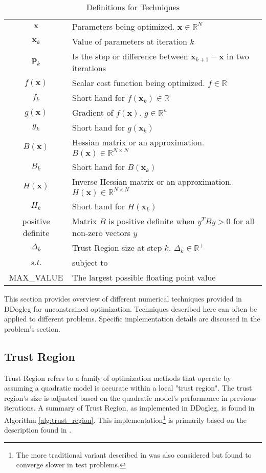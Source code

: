 \documentclass[peerreview,compsoc,onecolumn]{IEEEtran}
\newcommand{\R}{\mathbb{R}}
\begin{document}
\begin{table}[h]
\centering
\caption{\label{definitions:Techniques}Definitions for Techniques}
\begin{tabular}{cl}
$\bm{x}$ & Parameters being optimized. $\bm{x} \in \R^N$ \\
$\bm{x}_k$ & Value of parameters at iteration $k$ \\
$\bm{p}_k$ & Is the step or difference between $\bm{x}_{k+1}-\bm{x}$ in two iterations \\
$f(\bm{x})$ & Scalar cost function being optimized. $f \in \R$ \\
$f_k$ & Short hand for $f(\bm{x}_k) \in \R $ \\
$g(\bm{x})$ & Gradient of $f(\bm{x})$. $g \in \R^n$ \\
$g_k$ & Short hand for $g(\bm{x}_k)$ \\
$B(\bm{x})$ & Hessian matrix or an approximation. $B(\bm{x}) \in \R^{N \times N}$ \\ 
$B_k$ & Short hand for $B(\bm{x}_k)$ \\
$H(\bm{x})$ & Inverse Hessian matrix or an approximation. $H(\bm{x}) \in \R^{N \times N}$  \\ 
$H_k$ & Short hand for $H(\bm{x}_k)$ \\
positive definite & Matrix $B$ is positive definite when $y^T B y > 0$ for all non-zero vectors $y$  \\
$\Delta_k$ & Trust Region size at step $k$. $\Delta_k \in \R^{+}$\\
$s.t.$ & subject to  \\
MAX\_VALUE & The largest possible floating point value
\end{tabular}
\end{table}

This section provides overview of different numerical techniques provided in DDogleg for unconstrained optimization. Techniques described here can often be applied to different problems. Specific implementation details are discussed in the problem's section.

\subsection{Trust Region}
Trust Region refers to a family of optimization methods that operate by assuming a quadratic model is accurate within a local "trust region". The trust region's size is adjusted based on the quadratic model's performance in previous iterations. A summary of Trust Region, as implemented in DDogleg, is found in Algorithm \ref{alg:trust_region}. This implementation\footnote{The more traditional variant described in \cite{numopt2006,fletcher1987} was also considered but found to converge slower in test problems.} is primarily based on the description found in \cite{IMM2004}.
\end{document}

